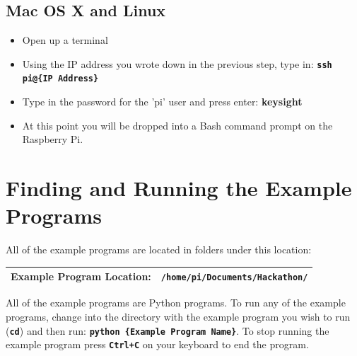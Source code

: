 \documentclass{article}
\def\code#1{\textbf{\texttt{#1}}}
\begin{document}
	\subsection{Mac OS X and Linux}
	
		\begin{itemize}
			\item Open up a terminal
			
			\item Using the IP address you wrote down in the previous step, type in: \code{ssh pi@\{IP Address\}}
			
			\item Type in the password for the 'pi' user and press enter: \textbf{keysight}
			
			\item At this point you will be dropped into a Bash command prompt on the Raspberry Pi.
			
		\end{itemize}





\section{Finding and Running the Example Programs}

All of the example programs are located in folders under this location:

	\begin{center}
		\begin{tabular}{| l | c |}
			\hline
			\textbf{Example Program Location:} & \code{/home/pi/Documents/Hackathon/} \\
			\hline
		\end{tabular}
	\end{center}

All of the example programs are Python programs. To run any of the example programs, change into the directory with the example program you wish to run (\code{cd}) and then run: \code{python \{Example Program Name\}}. To stop running the example program press \code{Ctrl+C} on your keyboard to end the program.




\end{document}
